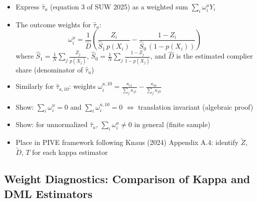 \documentclass[12pt, a4paper]{article}
\begin{document}
\begin{itemize}
  \item Express $\hat\tau_u$ (equation 3 of SUW 2025) as a weighted sum $\sum_i \omega_i^u Y_i$
  \item The outcome weights for $\hat\tau_u$:
    \[
      \omega_i^u = \frac{1}{\hat{D}} \left( \frac{Z_i}{\hat{S}_1 \, p(X_i)} - \frac{1 - Z_i}{\hat{S}_0 \, (1 - p(X_i))} \right)
    \]
    where $\hat{S}_1 = \frac{1}{N}\sum_j \frac{Z_j}{p(X_j)}$, $\hat{S}_0 = \frac{1}{N}\sum_j \frac{1-Z_j}{1-p(X_j)}$, and $\hat{D}$ is the estimated complier share (denominator of $\hat\tau_u$)
  \item Similarly for $\hat\tau_{a,10}$: weights $\omega_i^{a,10} = \frac{\kappa_{i1}}{\sum_j \kappa_{j1}} - \frac{\kappa_{i0}}{\sum_j \kappa_{j0}}$
  \item Show: $\sum_i \omega_i^u = 0$ and $\sum_i \omega_i^{a,10} = 0$ $\Leftrightarrow$ translation invariant (algebraic proof)
  \item Show: for unnormalized $\hat\tau_a$, $\sum_i \omega_i^a \neq 0$ in general (finite sample)
  \item Place in PIVE framework following Knaus (2024) Appendix A.4: identify $\tilde{Z}$, $\tilde{D}$, $T$ for each kappa estimator
\end{itemize}

\subsection{Weight Diagnostics: Comparison of Kappa and DML Estimators}
\end{document}
